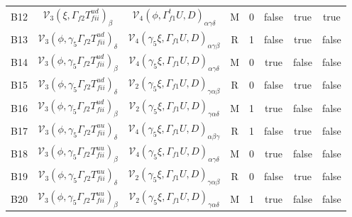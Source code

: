 \documentclass{article}[12pt]
\begin{document}
{\begin{landscape}
\begin{tabular}{ c c c c c c c c}
B12& ${\mathcal V}_3(\xi,\Gamma_{f2}T^{ud}_{fii})_{\beta}$  & ${\mathcal V}_4(\phi, \Gamma_{f1}^tU,D)_{\alpha\gamma\delta}$ & M & 0 & false  & true & true \\
B13& ${\mathcal V}_3(\phi,\gamma_5\Gamma_{f2}T^{ud}_{fii})_{\delta}$ & ${\mathcal V}_4(\gamma_5\xi, \Gamma_{f1}  U,D)_{\alpha\gamma\beta}$  & R & 1 & false & true & false  \\
B14& ${\mathcal V}_3(\phi,\gamma_5\Gamma_{f2}T^{ud}_{fii})_{\beta}$  & ${\mathcal V}_4(\gamma_5\xi, \Gamma_{f1}  U,D)_{\alpha\gamma\delta}$ & M & 0 & true  & false & false \\
B15& ${\mathcal V}_3(\phi,\gamma_5\Gamma_{f2}T^{ud}_{fii})_{\delta}$ & ${\mathcal V}_2(\gamma_5\xi, \Gamma_{f1}  U,D)_{\gamma\alpha\beta}$  & R & 0 & false & true  & false \\
B16& ${\mathcal V}_3(\phi,\gamma_5\Gamma_{f2}T^{ud}_{fii})_{\beta}$  & ${\mathcal V}_2(\gamma_5\xi, \Gamma_{f1}  U,D)_{\gamma\alpha\delta}$ & M & 1 & true  & false & false \\
B17& ${\mathcal V}_3(\phi,\gamma_5\Gamma_{f2}T^{uu}_{fii})_{\delta}$ & ${\mathcal V}_4(\gamma_5\xi, \Gamma_{f1}  U,D)_{\alpha\beta\gamma}$  & R & 1 & false & true & false\\
B18& ${\mathcal V}_3(\phi,\gamma_5\Gamma_{f2}T^{uu}_{fii})_{\beta}$  & ${\mathcal V}_4(\gamma_5\xi, \Gamma_{f1}  U,D)_{\alpha\gamma\delta}$ & M & 0 & true  & false & false \\
B19& ${\mathcal V}_3(\phi,\gamma_5\Gamma_{f2}T^{uu}_{fii})_{\delta}$ & ${\mathcal V}_2(\gamma_5\xi, \Gamma_{f1}  U,D)_{\gamma\alpha\beta}$  & R & 0 & false & true  & false \\
B20& ${\mathcal V}_3(\phi,\gamma_5\Gamma_{f2}T^{uu}_{fii})_{\beta}$  & ${\mathcal V}_2(\gamma_5\xi, \Gamma_{f1}  U,D)_{\gamma\alpha\delta}$ & M & 1 & true  & false & false  \\
\end{tabular}
\end{landscape}
}
\end{document}
